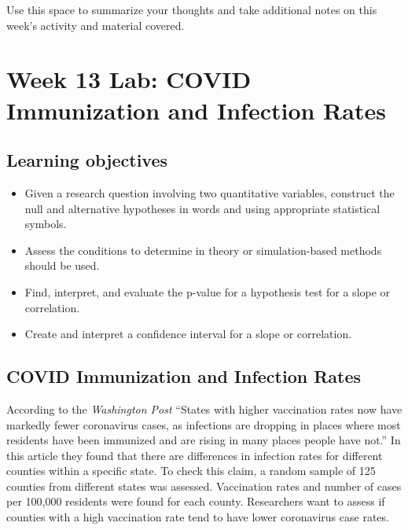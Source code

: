 \documentclass[
]{report}
\begin{document}
Use this space to summarize your thoughts and take additional notes on this week's activity and material covered.

\newpage

\hypertarget{week-13-lab-covid-immunization-and-infection-rates}{%
\section{Week 13 Lab: COVID Immunization and Infection Rates}\label{week-13-lab-covid-immunization-and-infection-rates}}


\hypertarget{learning-objectives-19}{%
\subsection{Learning objectives}\label{learning-objectives-19}}

\begin{itemize}
\item
  Given a research question involving two quantitative variables, construct the null and alternative hypotheses
  in words and using appropriate statistical symbols.
\item
  Assess the conditions to determine in theory or simulation-based methods should be used.
\item
  Find, interpret, and evaluate the p-value for a hypothesis test for a slope or correlation.
\item
  Create and interpret a confidence interval for a slope or correlation.
\end{itemize}

\hypertarget{covid-immunization-and-infection-rates}{%
\subsection{COVID Immunization and Infection Rates}\label{covid-immunization-and-infection-rates}}

According to the \emph{Washington Post} ``States with higher vaccination rates now have markedly fewer coronavirus cases, as infections are dropping in places where most residents have been immunized and are rising in many places people have not.'' In this article they found that there are differences in infection rates for different counties within a specific state. To check this claim, a random sample of 125 counties from different states was assessed. Vaccination rates and number of cases per 100,000 residents were found for each county. Researchers want to assess if counties with a high vaccination rate tend to have lower coronavirus case rates.
\end{document}
